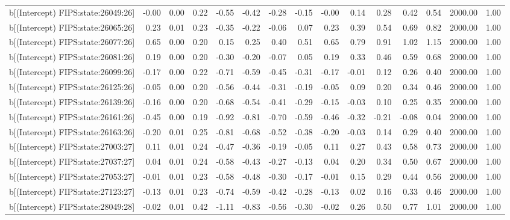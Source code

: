 \begin{table}[ht]
\begin{tabular}{rrrrrrrrrrrrrrr}
  b[(Intercept) FIPS:state:26049:26] & -0.00 & 0.00 & 0.22 & -0.55 & -0.42 & -0.28 & -0.15 & -0.00 & 0.14 & 0.28 & 0.42 & 0.54 & 2000.00 & 1.00 \\ 
  b[(Intercept) FIPS:state:26065:26] & 0.23 & 0.01 & 0.23 & -0.35 & -0.22 & -0.06 & 0.07 & 0.23 & 0.39 & 0.54 & 0.69 & 0.82 & 2000.00 & 1.00 \\ 
  b[(Intercept) FIPS:state:26077:26] & 0.65 & 0.00 & 0.20 & 0.15 & 0.25 & 0.40 & 0.51 & 0.65 & 0.79 & 0.91 & 1.02 & 1.15 & 2000.00 & 1.00 \\ 
  b[(Intercept) FIPS:state:26081:26] & 0.19 & 0.00 & 0.20 & -0.30 & -0.20 & -0.07 & 0.05 & 0.19 & 0.33 & 0.46 & 0.59 & 0.68 & 2000.00 & 1.00 \\ 
  b[(Intercept) FIPS:state:26099:26] & -0.17 & 0.00 & 0.22 & -0.71 & -0.59 & -0.45 & -0.31 & -0.17 & -0.01 & 0.12 & 0.26 & 0.40 & 2000.00 & 1.00 \\ 
  b[(Intercept) FIPS:state:26125:26] & -0.05 & 0.00 & 0.20 & -0.56 & -0.44 & -0.31 & -0.19 & -0.05 & 0.09 & 0.20 & 0.34 & 0.46 & 2000.00 & 1.00 \\ 
  b[(Intercept) FIPS:state:26139:26] & -0.16 & 0.00 & 0.20 & -0.68 & -0.54 & -0.41 & -0.29 & -0.15 & -0.03 & 0.10 & 0.25 & 0.35 & 2000.00 & 1.00 \\ 
  b[(Intercept) FIPS:state:26161:26] & -0.45 & 0.00 & 0.19 & -0.92 & -0.81 & -0.70 & -0.59 & -0.46 & -0.32 & -0.21 & -0.08 & 0.04 & 2000.00 & 1.00 \\ 
  b[(Intercept) FIPS:state:26163:26] & -0.20 & 0.01 & 0.25 & -0.81 & -0.68 & -0.52 & -0.38 & -0.20 & -0.03 & 0.14 & 0.29 & 0.40 & 2000.00 & 1.00 \\ 
  b[(Intercept) FIPS:state:27003:27] & 0.11 & 0.01 & 0.24 & -0.47 & -0.36 & -0.19 & -0.05 & 0.11 & 0.27 & 0.43 & 0.58 & 0.73 & 2000.00 & 1.00 \\ 
  b[(Intercept) FIPS:state:27037:27] & 0.04 & 0.01 & 0.24 & -0.58 & -0.43 & -0.27 & -0.13 & 0.04 & 0.20 & 0.34 & 0.50 & 0.67 & 2000.00 & 1.00 \\ 
  b[(Intercept) FIPS:state:27053:27] & -0.01 & 0.01 & 0.23 & -0.58 & -0.48 & -0.30 & -0.17 & -0.01 & 0.15 & 0.29 & 0.44 & 0.56 & 2000.00 & 1.00 \\ 
  b[(Intercept) FIPS:state:27123:27] & -0.13 & 0.01 & 0.23 & -0.74 & -0.59 & -0.42 & -0.28 & -0.13 & 0.02 & 0.16 & 0.33 & 0.46 & 2000.00 & 1.00 \\ 
  b[(Intercept) FIPS:state:28049:28] & -0.02 & 0.01 & 0.42 & -1.11 & -0.83 & -0.56 & -0.30 & -0.02 & 0.26 & 0.50 & 0.77 & 1.01 & 2000.00 & 1.00 \\ 

\end{tabular}
\end{table}

